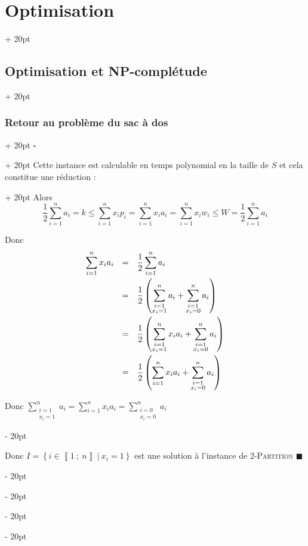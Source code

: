 \documentclass[a4paper, 12pt, twoside]{article}
\newcommand{\nset}[2]{\left\llbracket #1\ ;\ #2 \right\rrbracket}
\newcommand{\lr}[1]{\left( #1 \right)}
\newcommand{\set}[1]{\left\{ #1 \right\}}
\renewcommand{\le}{\leqslant}
\newcommand{\ind}[1][20pt]{\advance\leftskip + #1}
\newcommand{\deind}[1][20pt]{\advance\leftskip - #1}
\newenvironment{indt}[2][20pt]{#2 \par \ind[#1]}{\par \deind} %
\newenvironment{proof}[1][{}]{\begin{indt}{$\square$ #1}}{$\blacksquare$ \end{indt}}
\newcommand{\1}{\mathbbm 1}
\begin{document}
\begin{indt}{\section{Optimisation}}
\begin{indt}{\subsection{Optimisation et \textbf{NP}-complétude}}
\begin{indt}{\subsubsection{Retour au problème du sac à dos}}
\begin{proof}
\begin{indt}{Cette instance est calculable en temps polynomial en la taille de $S$ et cela constitue une réduction :}
                        Alors
                        \[
                            \dfrac 1 2 \sum_{i = 1}^n a_i
                            = k
                            \le \sum_{i = 1}^n x_i p_i
                            = \sum_{i = 1}^n x_i a_i
                            = \sum_{i = 1}^n x_i w_i
                            \le W
                            = \dfrac 1 2 \sum_{i = 1}^n a_i
                        \]

                        Donc
                        \[
                            \begin{array}{rcl}
                                \displaystyle
                                \sum_{i = 1}^n x_i a_i
                                &=& \displaystyle
                                \dfrac 1 2 \sum_{i = 1}^n a_i
                                \vspace{3pt}
                                \\
                                &=& \displaystyle
                                \dfrac 1 2 \lr{\sum_{\substack{i = 1 \\ x_i = 1}}^n a_i + \sum_{\substack{i = 1 \\ x_i = 0}}^n a_i}
                                \vspace{3pt}
                                \\
                                &=& \displaystyle
                                \dfrac 1 2 \lr{\sum_{\substack{i = 1 \\ x_i = 1}}^n x_i a_i + \sum_{\substack{i = 1 \\ x_i = 0}}^n a_i}
                                \vspace{3pt}
                                \\
                                &=& \displaystyle
                                \dfrac 1 2 \lr{\sum_{\substack{i = 1}}^n x_i a_i + \sum_{\substack{i = 1 \\ x_i = 0}}^n a_i}
                            \end{array}
                        \]

                        Donc $\displaystyle \sum_{\substack{i = 1 \\ x_i = 1}}^n a_i = \sum_{i = 1}^n x_i a_i = \sum_{\substack{i = 0 \\ x_i = 0}}^n a_i$
                    \end{indt}

                    Donc $I = \set{i \in \nset 1 n\ |\ x_i = 1}$ est une solution à l'instance de 2-\textsc{Partition}
                \end{proof}
            \end{indt}


\end{indt}
\end{indt}
\end{document}
